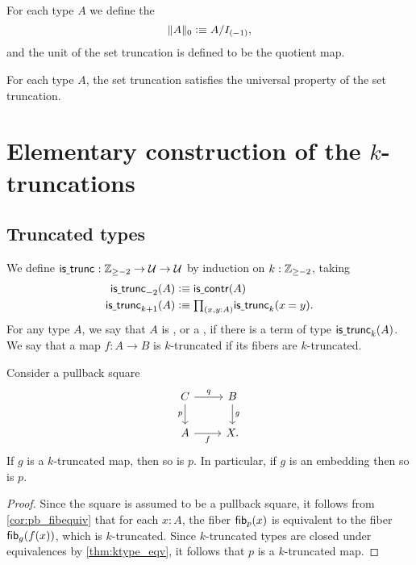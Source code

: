 \begin{defn}
For each type $A$ we define the 
\begin{equation*}
\trunc{0}{A}\defeq A/I_{(-1)},
\end{equation*}
and the unit of the set truncation is defined to be the quotient map.
\end{defn}

\begin{thm}
For each type $A$, the set truncation satisfies the universal property of the set truncation.
\end{thm}

\section{Elementary construction of the $k$-truncations}

\subsection{Truncated types}
\begin{defn}
We define $\istrunc{} : \Z_{\geq-2}\to\UU\to\UU$ by induction on $k:\Z_{\geq -2}$, taking
\begin{align*}
\istrunc{-2}(A) & \defeq \iscontr(A) \\
\istrunc{k+1}(A) & \defeq \prd{x,y:A}\istrunc{k}(\id{x}{y}).\qedhere
\end{align*}
For any type $A$, we say that $A$ is , or a , if there is a term of type $\istrunc{k}(A)$. We say that a map $f:A\to B$ is $k$-truncated if its fibers are $k$-truncated.
\end{defn}

\begin{lem}\label{cor:pb_trunc}
Consider a pullback square
\begin{equation*}
\begin{tikzcd}
C \arrow[r,"q"] \arrow[d,swap,"p"] & B \arrow[d,"g"] \\
A \arrow[r,swap,"f"] & X.
\end{tikzcd}
\end{equation*}
If $g$ is a $k$-truncated map, then so is $p$. In particular, if $g$ is an embedding then so is $p$.
\end{lem}

\begin{proof}
Since the square is assumed to be a pullback square, it follows from \cref{cor:pb_fibequiv} that for each $x:A$, the fiber $\fib{p}{x}$ is equivalent to the fiber $\fib{g}{f(x)}$, which is $k$-truncated. Since $k$-truncated types are closed under equivalences by \cref{thm:ktype_eqv}, it follows that $p$ is a $k$-truncated map.
\end{proof}


